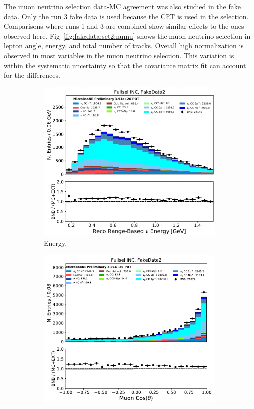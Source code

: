 The muon neutrino selection data-MC agreement was also studied in the fake data.  Only the run 3 fake data is used because the CRT is used in the selection. Comparisons where runs 1 and 3 are combined show similar effects to the ones observed here. 
Fig~\ref{fig:fakedata:set2:numu} shows the muon neutrino selection in lepton angle, energy, and total number of tracks. Overall high normalization is observed in most variables in the muon neutrino selection.  This variation is within the systematic uncertainty so that the covariance matrix fit can account for the differences.

\begin{figure}[H] 
\begin{center}
    \begin{subfigure}[b]{0.3\textwidth}
    \centering
    \includegraphics[width=1.00\textwidth]{Fakedata/set2/numu_energy.pdf}
    \caption{\label{fig:fakedata:set2:numu_energy} Energy.}
    \end{subfigure}
    \begin{subfigure}[b]{0.3\textwidth}
    \centering
    \includegraphics[width=1.00\textwidth]{Fakedata/set2/numu_costheta.pdf}

\end{subfigure}
\end{center}
\end{figure}
